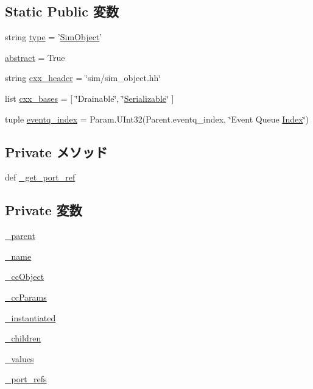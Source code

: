 \subsection*{Static Public 変数}
\begin{DoxyCompactItemize}
\item 
string \hyperlink{classm5_1_1SimObject_1_1SimObject_acce15679d830831b0bbe8ebc2a60b2ca}{type} = '\hyperlink{classm5_1_1SimObject_1_1SimObject}{SimObject}'
\item 
\hyperlink{classm5_1_1SimObject_1_1SimObject_a17fa61ac3806b481cafee5593b55e5d0}{abstract} = True
\item 
string \hyperlink{classm5_1_1SimObject_1_1SimObject_a17da7064bc5c518791f0c891eff05fda}{cxx\_\-header} = \char`\"{}sim/sim\_\-object.hh\char`\"{}
\item 
list \hyperlink{classm5_1_1SimObject_1_1SimObject_a7a37140d4f02995d1c41e8a8381e571a}{cxx\_\-bases} = \mbox{[} \char`\"{}Drainable\char`\"{}, \char`\"{}\hyperlink{classSerializable}{Serializable}\char`\"{} \mbox{]}
\item 
tuple \hyperlink{classm5_1_1SimObject_1_1SimObject_aac7a0e8ba8e20b2f15df694a32a3a629}{eventq\_\-index} = Param.UInt32(Parent.eventq\_\-index, \char`\"{}Event Queue \hyperlink{TypeDefines_8hh_a39642de41f3574937f399f4fab25ba18}{Index}\char`\"{})
\end{DoxyCompactItemize}
\subsection*{Private メソッド}
\begin{DoxyCompactItemize}
\item 
def \hyperlink{classm5_1_1SimObject_1_1SimObject_aa6e711a94a8562cfd1099d3d89b9f960}{\_\-get\_\-port\_\-ref}
\end{DoxyCompactItemize}
\subsection*{Private 変数}
\begin{DoxyCompactItemize}
\item 
\hyperlink{classm5_1_1SimObject_1_1SimObject_a8365c86d70a25bb54ee36278d93237a9}{\_\-parent}
\item 
\hyperlink{classm5_1_1SimObject_1_1SimObject_a705391f3be33314bd5788a28f7538642}{\_\-name}
\item 
\hyperlink{classm5_1_1SimObject_1_1SimObject_aabe4cb2ca7833ea492d96624d2a870e3}{\_\-ccObject}
\item 
\hyperlink{classm5_1_1SimObject_1_1SimObject_aa5b4f86c1f3fb95d87f019af682b1879}{\_\-ccParams}
\item 
\hyperlink{classm5_1_1SimObject_1_1SimObject_aea4e1ce00a994975e7ed5da942c38445}{\_\-instantiated}
\item 
\hyperlink{classm5_1_1SimObject_1_1SimObject_a3a71a1fb409e5e925963b619df696b64}{\_\-children}
\item 
\hyperlink{classm5_1_1SimObject_1_1SimObject_a82bf87e123386ace314cad701480d203}{\_\-values}
\item 
\hyperlink{classm5_1_1SimObject_1_1SimObject_a7f269cde8ece327a835f2ace21517ce4}{\_\-port\_\-refs}
\end{DoxyCompactItemize}
